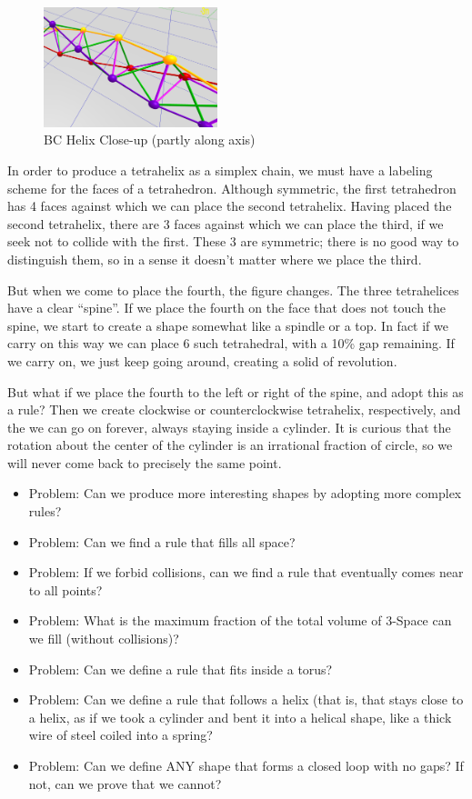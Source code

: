 \documentclass[11pt]{article}
\begin{document}
\begin{figure}
  \centering
     \includegraphics[width=0.45\textwidth]{figures/BCHelixCloseUp.png}
     \caption{BC Helix Close-up (partly along axis)}
  \label{fig:closeup}     
\end{figure}



In order to produce a tetrahelix as a simplex chain, we must have a labeling scheme for the faces of a tetrahedron.
Although symmetric, the first tetrahedron has 4 faces against which we can place the second tetrahelix.
Having placed the second tetrahelix, there are 3 faces against which we can place the third, if we
seek not to collide with the first. These 3 are symmetric; there is no good way to distinguish them,
so in a sense it doesn't matter where we place the third.

But when we come to place the fourth, the figure changes. The three tetrahelices have a clear ``spine''. If we
place the fourth on the face that does not touch the spine, we start to create a shape somewhat like a spindle or a top.
In fact if we carry on this way we can place 6 such tetrahedral, with a 10\% gap remaining. If we carry on, we just keep
going around, creating a solid of revolution.

But what if we place the fourth to the left or right of the spine, and adopt this as a rule? Then we create
clockwise or counterclockwise tetrahelix, respectively, and the we can go on forever, always staying inside a cylinder.
It is curious that the rotation about the center of the cylinder is an irrational fraction of circle, so we will
never come back to precisely the same point.

\begin{itemize}
\item Problem: Can we produce more interesting shapes by adopting more complex rules?
\item Problem: Can we find a rule that fills all space?
\item Problem: If we forbid collisions, can we find a rule that eventually comes near to all points?
\item Problem: What is the maximum fraction of the total volume of 3-Space can we fill (without collisions)?
\item Problem: Can we define a rule that fits inside a torus?
\item Problem: Can we define a rule that follows a helix (that is, that stays close to a helix, as if we took a cylinder and bent it into a helical shape, like a thick wire of
steel coiled into a spring?
\item Problem: Can we define ANY shape that forms a closed loop with no gaps? If not, can we prove that we cannot?
\end{itemize}
\end{document}
